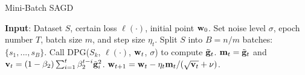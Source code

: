 \documentclass[11pt]{article}
\begin{document}
\begin{algorithm}[H] 
\caption{Mini-Batch \textsc{SAGD}}
\begin{algorithmic}[1] \label{algo: mini-StAda}
\STATE \textbf{Input}: Dataset $S$,  certain loss $\ell(\cdot)$, initial point $\mathbf{w}_0$.
\STATE Set noise level $\sigma$, epoch number $T$,  batch size $m$, and step size $\eta_t$.
\STATE Split $S$ into $B=n/m$ batches: $\{ s_1,..., s_B\}$.
\STATE Call DPG($S_k$,  $\ell(\cdot)$, $\mathbf{w}_t$, $\sigma$) to compute $\tilde {\mathbf{g}}_t$.
\STATE $\mathbf{m}_t = \tilde {\mathbf{g}}_t$ and $\mathbf{v}_t = \left(1-\beta_{2}\right) \sum_{i=1}^{t} \beta_{2}^{t-i} \tilde {\mathbf{g}}_{i}^{2}$.
\STATE $\mathbf{w}_{t+1}=\mathbf{w}_{t}-\eta_t \mathbf{m}_t /(\sqrt{\mathbf{v}_t}+\nu)$.
\ENDFOR
\ENDFOR 
\end{algorithmic}
\end{algorithm} 

\end{document}
